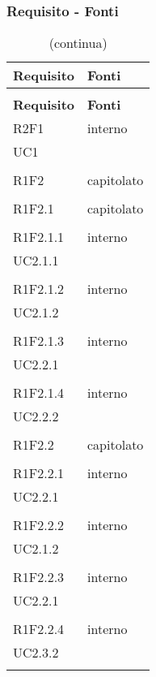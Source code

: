 \subsubsection{Requisito - Fonti}


\begin{longtable}{ >{\centering}p{}
		>{\centering}p{}}
	
	\caption{Tabella tracciamento requisito-fonti}\\
	\rowcolorhead 
	\textbf{\color{white}Requisito}
	& \textbf{\color{white}Fonti} 
	\tabularnewline 
	\endfirsthead
	\rowcolor{white}\caption[]{(continua)}\\	
	\rowcolorhead 
	\textbf{\color{white}Requisito}
	& \textbf{\color{white}Fonti} 
	\tabularnewline 
	\endhead
	R2F1 & interno\\UC1\\\tabularnewline
	
	R1F2 & capitolato\\\tabularnewline
	
	R1F2.1 & capitolato\\\tabularnewline
	
	R1F2.1.1 & interno\\UC2.1.1\\\tabularnewline
	
	R1F2.1.2 & interno\\UC2.1.2\\\tabularnewline
	
	R1F2.1.3 & interno\\UC2.2.1\\\tabularnewline
	
	R1F2.1.4 & interno\\UC2.2.2\\\tabularnewline
	
	R1F2.2 & capitolato\\\tabularnewline
	
	R1F2.2.1 & interno\\UC2.2.1\\\tabularnewline
	
	R1F2.2.2 & interno\\UC2.1.2\\\tabularnewline
	
	R1F2.2.3 & interno\\UC2.2.1\\\tabularnewline
	
	R1F2.2.4 & interno\\UC2.3.2\\\tabularnewline
	

\end{longtable}

